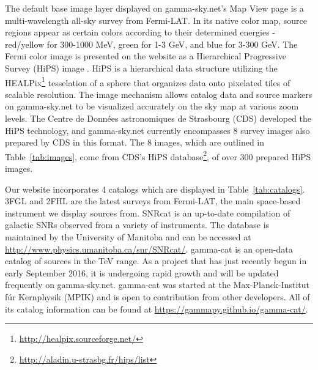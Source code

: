 % 






The default base image layer displayed on gamma-sky.net's Map View page is a multi-wavelength all-sky survey from Fermi-LAT. In its native color map, source regions appear as certain colors according to their determined energies - red/yellow for 300-1000 MeV, green for 1-3 GeV, and blue for 3-300 GeV. The Fermi color image is presented on the website as a Hierarchical Progressive Survey (HiPS) image \cite{hips}. HiPS is a hierarchical data structure utilizing the HEALPix\footnote[1]{\url{http://healpix.sourceforge.net/}} tesselation of a sphere that organizes data onto pixelated tiles of scalable resolution. The image mechanism allows catalog data and source markers on gamma-sky.net to be visualized accurately on the sky map at various zoom levels. The Centre de Donn\'{e}es astronomiques de Strasbourg (CDS) developed the HiPS technology, and gamma-sky.net currently encompasses 8 survey images also prepared by CDS in this format. The 8 images, which are outlined in Table~\ref{tab:images}, come from CDS's HiPS database\footnote[2]{\url{http://aladin.u-strasbg.fr/hips/list}}, of over 300 prepared HiPS images.

Our website incorporates 4 catalogs which are displayed in Table~\ref{tab:catalogs}. 3FGL \cite{3fgl} and 2FHL \cite{2fhl} are the latest surveys from Fermi-LAT, the main space-based instrument we display sources from. SNRcat \cite{snrcat} is an up-to-date compilation of galactic SNRs observed from a variety of instruments. The database is maintained by the University of Manitoba and can be accessed at \url{http://www.physics.umanitoba.ca/snr/SNRcat/}. gamma-cat is an open-data catalog of sources in the TeV range. As a project that has just recently begun in early September 2016, it is undergoing rapid growth and will be updated frequently on gamma-sky.net. gamma-cat was started at the Max-Planck-Institut f\'{u}r Kernphysik (MPIK) and is open to contribution from other developers. All of its catalog information can be found at \url{https://gammapy.github.io/gamma-cat/}.


